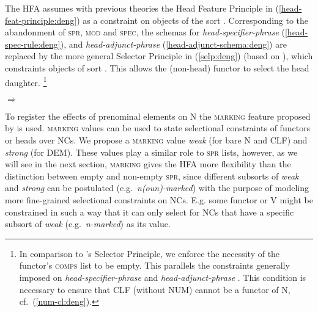 \documentclass[output=paper,colorlinks,citecolor=brown]{langscibook}
\begin{document}

 The HFA assumes with previous theories the Head Feature Principle in  (\ref{head-feat-principle:deng}) as a constraint on objects of the sort . Corresponding to the abandonment of  \textsc{spr}, \textsc{mod} and \textsc{spec}, the schemas for \textit{head-specifier-phrase} (\ref{head-spec-rule:deng}), and \textit{head-adjunct-phrase} (\ref{head-adjunct-schema:deng})  are replaced by the more general Selector Principle in (\ref{selp:deng}) (based on \citealt[164]{VanEynde06a}), which constraints objects of sort . This allows the (non-head) functor to select the head daughter.%
 \footnote{In comparison to \citeauthor{VanEynde06a}'s Selector Principle, we enforce the necessity of the functor's \textsc{comps} list to be empty. This parallels the constraints generally imposed on \textit{head-specifier-phrase} and \textit{head-adjunct-phrase} \citep[cf.][333 \& 335]{Mueller&MyP19a}. This condition is necessary to ensure that CLF (without NUM) cannot be a functor of N, cf.\ (\ref{num-cl:deng}).} %


\ea \label{selp:deng}
	 $\Rightarrow$ \\ 
\z 

To register the effects of prenominal elements on N the \textsc{marking} feature proposed by \citet[46]{Pollard&Sag94a} is used. \textsc{marking} values can be used to state selectional constraints of functors or heads over NCs. We propose a \textsc{marking} value \textit{weak} (for bare N and CLF) and \textit{strong}  (for DEM). These values play a similar role to \textsc{spr} lists, however,  as we will see in the next section, \textsc{marking}  gives the HFA more flexibility than the distinction between empty and non-empty \textsc{spr}, since different subsorts of \textit{weak} and  \textit{strong} can be postulated (e.g.\  \textit{n(oun)-marked}) with the purpose of modeling more fine-grained selectional constraints on  NCs. %
E.g. some functor or V might be constrained in such a way that it can only select for NCs that have a specific subsort of \textit{weak} (e.g.\ \textit{n-marked}) as its value.%
%
%
\end{document}
